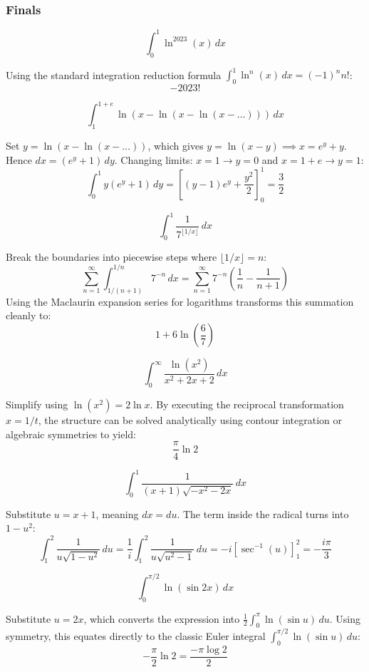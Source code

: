 \subsubsection*{Finals}
\begin{questions}

\question
\[ \int_0^1 \ln^{2023}(x) \,dx \]
\begin{solution}
Using the standard integration reduction formula $\int_0^1 \ln^n(x) \,dx = (-1)^n n!$:
\[ -2023! \]
\end{solution}

\question
\[ \int_1^{1+e} \ln(x - \ln(x - \ln(x - \dots))) \,dx \]
\begin{solution}
Set $y = \ln(x - \ln(x - \dots))$, which gives $y = \ln(x-y) \implies x = e^y + y$. Hence $dx = (e^y + 1) \,dy$. Changing limits: $x=1 \to y=0$ and $x=1+e \to y=1$:
\[ \int_0^1 y(e^y + 1) \,dy = \left[ (y-1)e^y + \frac{y^2}{2} \right]_0^1 = \frac{3}{2} \]
\end{solution}

\question
\[ \int_0^1 \frac{1}{7^{\lfloor 1/x \rfloor}} \,dx \]
\begin{solution}
Break the boundaries into piecewise steps where $\lfloor 1/x \rfloor = n$:
\[ \sum_{n=1}^\infty \int_{1/(n+1)}^{1/n} 7^{-n} \,dx = \sum_{n=1}^\infty 7^{-n}\left(\frac{1}{n} - \frac{1}{n+1}\right) \]
Using the Maclaurin expansion series for logarithms transforms this summation cleanly to:
\[ 1 + 6\ln\left(\frac{6}{7}\right) \]
\end{solution}

\question
\[ \int_0^\infty \frac{\ln(x^2)}{x^2+2x+2} \,dx \]
\begin{solution}
Simplify using $\ln(x^2) = 2\ln x$. By executing the reciprocal transformation $x = 1/t$, the structure can be solved analytically using contour integration or algebraic symmetries to yield:
\[ \frac{\pi}{4}\ln 2 \]
\end{solution}

\question
\[ \int_0^1 \frac{1}{(x+1)\sqrt{-x^2-2x}} \,dx \]
\begin{solution}
Substitute $u = x+1$, meaning $dx = du$. The term inside the radical turns into $1 - u^2$:
\[ \int_1^2 \frac{1}{u\sqrt{1-u^2}} \,du = \frac{1}{i}\int_1^2 \frac{1}{u\sqrt{u^2-1}} \,du = -i\left[\sec^{-1}(u)\right]_1^2 = -\frac{i\pi}{3} \]
\end{solution}

\question
\[ \int_0^{\pi/2} \ln(\sin 2x) \,dx \]
\begin{solution}
Substitute $u = 2x$, which converts the expression into $\frac{1}{2}\int_0^\pi \ln(\sin u) \,du$. Using symmetry, this equates directly to the classic Euler integral $\int_0^{\pi/2} \ln(\sin u) \,du$:
\[ -\frac{\pi}{2}\ln 2 = \frac{-\pi\log 2}{2} \]
\end{solution}


\end{questions}
